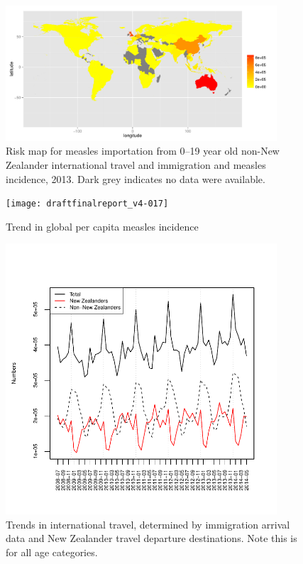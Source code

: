 \documentclass{article}
\begin{document}
\begin{figure}
\begin{center}
     \includegraphics[width=0.9\textwidth]{2013np4.pdf}
\end{center}
\caption{Risk map for measles importation from 0--19 year old non-New Zealander international travel and immigration and measles incidence, 2013. Dark grey indicates no data were available.}
\label{fig:imrisk12}
\end{figure}

\begin{figure}
\begin{center}
\texttt{[image: draftfinalreport\_v4-017]}
\end{center}
\caption{Trend in global per capita measles incidence}
\label{fig:trendincidence}
\end{figure}

\begin{figure}[H]
     \begin{center}
     \includegraphics[width=0.9\textwidth]{nzers.pdf}
     \end{center}
     \caption{Trends in international travel, determined by immigration arrival data and New Zealander travel departure destinations. Note this is for all age categories.}
     \label{fig:travel}
\end{figure}
\end{document}
